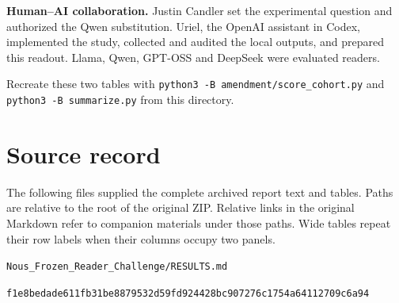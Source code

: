 \documentclass[11pt,letterpaper]{article}
\begin{document}
\textbf{Human–AI collaboration.} Justin Candler set the experimental question and authorized the Qwen substitution. Uriel, the OpenAI assistant in Codex, implemented the study, collected and audited the local outputs, and prepared this readout. Llama, Qwen, GPT-OSS and DeepSeek were evaluated readers.


Recreate these two tables with \nolinkurl{python3 -B amendment/score_cohort.py} and \nolinkurl{python3 -B summarize.py} from this directory.


\section*{Source record}

The following files supplied the complete archived report text and tables. Paths are relative to the root of the original ZIP. Relative links in the original Markdown refer to companion materials under those paths. Wide tables repeat their row labels when their columns occupy two panels.

\noindent\nolinkurl{Nous_Frozen_Reader_Challenge/RESULTS.md}\par

{\small\nolinkurl{f1e8bedade611fb31be8879532d59fd924428bc907276c1754a64112709c6a94}}\par
\end{document}
